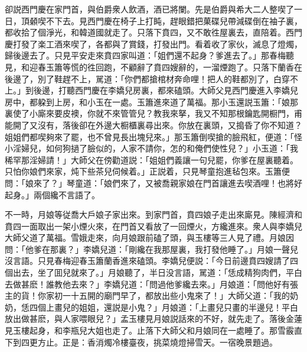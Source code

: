卻説西門慶在家門首，與伯爵衆人飲酒，酒已將闌。先是伯爵與希大二人整喫了一日，頂顙喫不下去。見西門慶在椅子上打盹，趕眼錯把菓碟兒帶減碟倒在袖子裏，都收拾了個淨光，和韓道國就走了。只落下賁四，又不敢徃屋裏去，直陪着。西門慶打發了楽工酒來喫了，各都與了賞錢，打發出門。看着收了家伙，滅息了燈燭，歸後邊去了。只見平安走來賁四家叫道：「姐們還不起身？爹進去了。」那春梅聽見，和迎春玉簫等慌的徃回跑，不顧辭了賁四嫂辭的，一溜煙跑了。只落下蘭香在後邊了，別了鞋趕不上，駡道：「你們都搶棺材奔命哩！把人的鞋都別了，白穿不上。」到後邊，打聽西門慶在李嬌兒房裏，都來磕頭。大師父見西門慶進入李嬌兒房中，都躱到上房，和小玉在一處。玉簫進來道了萬福。那小玉還説玉簫：「娘那裏使了小廝來要皮襖，你就不來管管兒？教我來拏，我又不知那根鑰匙開橱門，甫能開了又沒有，落後卻在外邊大橱櫃裏尋出來。你放在裏頭，又搗昏了你不知道？姐姐們都喫夠來了罷，也不曾見長出塊兒來。」那玉簫倒喫搶的臉飛紅，便道：「怪小淫婦兒，如何狗撾了臉似的，人家不請你，怎的和俺們使性兒？」小玉道：「我稀罕那淫婦請！」大師父在傍勸道説：「姐姐們義讓一句兒罷，你爹在屋裏聽着。只怕你娘們來家，炖下些茶兒伺候着。」正説着，只見琴童抱進毡包來。玉簫便問：「娘來了？」琴童道：「娘們來了，又被喬親家娘在門首讓進去喫酒哩！也將好起身。」兩個纔不言語了。

不一時，月娘等従喬大戶娘子家出來。到家門首，賁四娘子走出來廝見。陳經濟和賁四一面取出一架小煙火來，在門首又看放了一回煙火，方纔進來。衆人與李嬌兒大師父道了萬福。雪娥走來，向月娘跟前磕了頭，與玉樓等三人見了禮。月娘因問：「他爹在那裏？」李嬌兒道：「剛纔在我那屋裏，我打發他睡了。」月娘一聲兒沒言語。只見春梅迎春玉簫蘭香進來磕頭。李嬌兒便説：「今日前邊賁四嫂請了四個出去，坐了囬兒就來了。」月娘聽了，半日没言語，駡道：「恁成精狗肉們，平白去做甚麽！誰教他去來？」李嬌兒道：「問過他爹纔去來。」月娘道：「問他好有張主的貨！你家初一十五開的廟門早了，都放出些小鬼來了！」大師父道：「我的奶奶，恁四個上畫兒的姐姐，還説是小鬼？」月娘道：「上畫兒只畫的半邊兒！平白放出做甚麽，與人家喂眼兒？」孟玉樓見月娘説話來的不好，就先走了。落後金蓮見玉樓起身，和李瓶兒大姐也走了。止落下大師父和月娘同在一處睡了。那雪霰直下到四更方止。正是：香消燭冷樓臺夜，挑菜燒燈掃雪天。一宿晚景題過。

